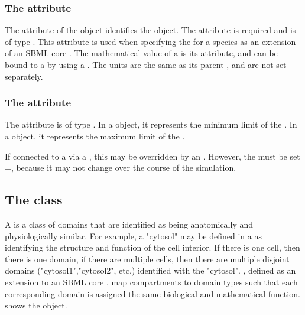 
\subsubsection{The \fixttspace{} attribute}
The  attribute of the \Boundary object identifies the object.  The attribute is required and is of type . This attribute is used when specifying the \BoundaryCondition for a species as an extension of an SBML core \Parameter.  The mathematical value of a \Boundary is its  attribute, and can be bound to a \Parameter by using a \SpatialSymbolReference.  The units are the same as its parent \CoordinateComponent, and are not set separately.

\subsubsection{The \fixttspace{} attribute}
The  attribute is of type . In a  object, it represents the minimum limit of the \CoordinateComponent.  In a  object, it represents the maximum limit of the \CoordinateComponent.


If connected to a \Parameter via a \SpatialSymbolReference, this  may be overridden by an \InitialAssignment.  However, the \Parameter must be set =, because it may not change over the course of the simulation.


\subsection{The  class}
\label{domaintype-class}
A \DomainType is a class of domains that are identified as being anatomically and physiologically similar.  For example, a \DomainType "cytosol" may be defined in a \Geometry as identifying the structure and function of the cell interior.  If there is one cell, then there is one domain, if there are multiple cells, then there are multiple disjoint domains ("cytosol1","cytosol2", etc.) identified with the \DomainType "cytosol".  \CompartmentMappings, defined as an extension to an SBML core \Compartment, map compartments to domain types such that each corresponding domain is assigned the same biological and mathematical function.  shows the \DomainType object.

